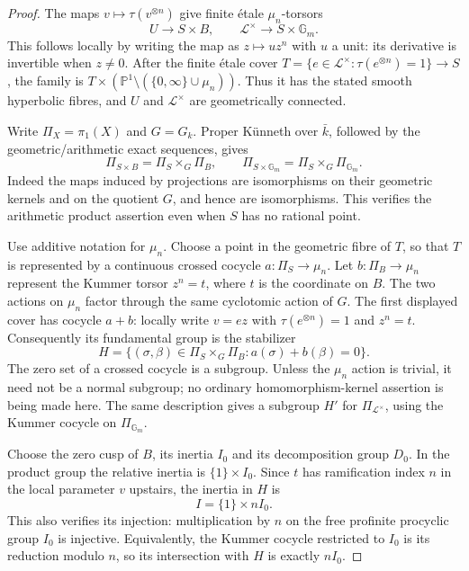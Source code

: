 \documentclass[11pt,a4paper]{article}
\begin{document}
\begin{proof}
The maps $v\mapsto\tau(v^{\otimes n})$ give finite \'etale
$\mu_n$-torsors
\[
 U\longrightarrow S\times B,\qquad
 \mathcal L^\times\longrightarrow S\times\mathbb G_m.
\]
This follows locally by writing the map as $z\mapsto u z^n$ with
$u$ a unit: its derivative is invertible when $z\ne0$.
After the finite \'etale cover
$T=\{e\in\mathcal L^\times:\tau(e^{\otimes n})=1\}\to S$,
the family is
$T\times(\mathbb P^1\setminus(\{0,\infty\}\cup\mu_n))$.
Thus it has the stated smooth hyperbolic fibres, and $U$ and
$\mathcal L^\times$ are geometrically connected.

Write $\Pi_X=\pi_1(X)$ and $G=G_k$.
Proper K\"unneth over $\bar k$, followed by the geometric/arithmetic
exact sequences, gives
\[
 \Pi_{S\times B}=\Pi_S\times_G\Pi_B,\qquad
 \Pi_{S\times\mathbb G_m}=\Pi_S\times_G\Pi_{\mathbb G_m}.
\]
Indeed the maps induced by projections are isomorphisms on their
geometric kernels and on the quotient $G$, and hence are
isomorphisms. This verifies the arithmetic product assertion even
when $S$ has no rational point.

Use additive notation for $\mu_n$. Choose a point in the geometric
fibre of $T$, so that $T$ is represented by a continuous crossed
cocycle $a:\Pi_S\to\mu_n$. Let
$b:\Pi_B\to\mu_n$ represent the Kummer torsor $z^n=t$, where
$t$ is the coordinate on $B$. The two actions on $\mu_n$ factor
through the same cyclotomic action of $G$. The first displayed
cover has cocycle $a+b$: locally write $v=e z$ with
$\tau(e^{\otimes n})=1$ and $z^n=t$. Consequently its fundamental
group is the stabilizer
\begin{equation}\label{eq:ag-cyclic-stabilizer}
 H=\{(\sigma,\beta)\in\Pi_S\times_G\Pi_B:
                 a(\sigma)+b(\beta)=0\}.
\end{equation}
The zero set of a crossed cocycle is a subgroup. Unless the
$\mu_n$ action is trivial, it need not be a normal subgroup; no
ordinary homomorphism-kernel assertion is being made here.
The same description gives a subgroup $H'$ for
$\Pi_{\mathcal L^\times}$, using the Kummer cocycle on
$\Pi_{\mathbb G_m}$.

Choose the zero cusp of $B$, its inertia $I_0$ and its
decomposition group $D_0$. In the product group the relative
inertia is $\{1\}\times I_0$. Since $t$ has ramification index
$n$ in the local parameter $v$ upstairs, the inertia in $H$ is
\[
 I=\{1\}\times nI_0.
\]
This also verifies its injection: multiplication by $n$ on the
free profinite procyclic group $I_0$ is injective. Equivalently,
the Kummer cocycle restricted to $I_0$ is its reduction modulo
$n$, so its intersection with $H$ is exactly $nI_0$.


\end{proof}
\end{document}
